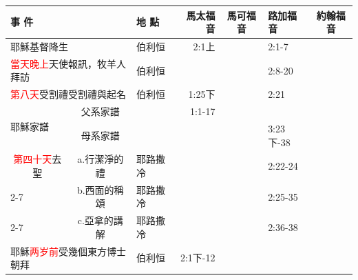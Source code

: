 \begin{table}[H]
  \centering
    \begin{tabular}{p{8.93em}c|p{5.07em}|r|c|p{5.215em}|c}
    \toprule
    \multicolumn{2}{p{14.575em}|}{事 件}  & 地 點   & \multicolumn{1}{p{4.215em}|}{馬太福音} & \multicolumn{1}{p{4.215em}|}{馬可福音} & 路加福音  & \multicolumn{1}{p{4.215em}}{約翰福音} \\
    \midrule
    \multicolumn{2}{p{14.575em}|}{耶穌基督降生} & 伯利恒   & \multicolumn{1}{p{4.215em}|}{2:1上} &       & 2:1-7 &  \\
    \midrule
    \multicolumn{2}{p{14.575em}|}{\textcolor{red}{當天晚上}天使報訊，牧羊人拜訪} & 伯利恒   &       &       & 2:8-20 &  \\
    \midrule
    \multicolumn{2}{p{14.575em}|}{\textcolor{red}{第八天}受割禮受割禮與起名} & 伯利恒   & \multicolumn{1}{p{4.215em}|}{1:25下} &       & \multicolumn{1}{l|}{2:21} &  \\
    \midrule
    \multicolumn{1}{l|}{\multirow{2}[4]{*}{耶穌家譜}} & \multicolumn{1}{p{6.645em}|}{父系家譜} & \multicolumn{1}{r|}{} & \multicolumn{1}{p{4.215em}|}{1:1-17} &       & \multicolumn{1}{r|}{} &  \\
    
\cmidrule{2-7}    \multicolumn{1}{c|}{} & \multicolumn{1}{p{6.645em}|}{母系家譜} & \multicolumn{1}{r|}{} &       &       & 3:23下-38 &  \\  \midrule

\multicolumn{1}{c|}{\textcolor{red}{第四十天}去聖} & \multicolumn{1}{p{6.645em}|}{a.行潔淨的禮} & 耶路撒冷  &       &       & 2:22-24 &  \\
\cmidrule{2-7}    \multicolumn{1}{c|}{殿做奉獻禮,} & \multicolumn{1}{p{6.645em}|}{b.西面的稱頌} & 耶路撒冷  &       &       & 2:25-35 &  \\
\cmidrule{2-7}    \multicolumn{1}{c|}{耶穌被獻給神} & \multicolumn{1}{p{6.645em}|}{c.亞拿的講解} & 耶路撒冷  &       &       & 2:36-38 &  \\ \midrule

 \multicolumn{2}{p{14.575em}|}{耶穌\textcolor{red}{两岁前}受幾個東方博士朝拜} & 伯利恒   & \multicolumn{1}{p{4.215em}|}{2:1下-12} &       & \multicolumn{1}{r|}{} &  \\ \midrule


\end{tabular}
\end{table}
